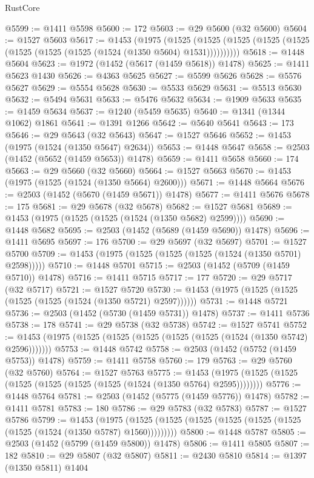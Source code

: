 \begin{lexlean}{RustCore}
\begin{coremodule}
@5599 := @1411 @5598
@5600 := 172
@5603 := @29 @5600 (@32 @5600)
@5604 := @1527 @5603
@5617 := @1453
    (@1975
      (@1525 (@1525 (@1525 (@1525 (@1525 (@1525 (@1525 (@1525 (@1524 (@1350 @5604) @1531))))))))))
@5618 := @1448 @5604
@5623 := @1972 (@1452 (@5617 (@1459 @5618)) @1478)
@5625 := @1411 @5623 @1430
@5626 := @4363 @5625
@5627 := @5599 @5626
@5628 := @5576 @5627
@5629 := @5554 @5628
@5630 := @5533 @5629
@5631 := @5513 @5630
@5632 := @5494 @5631
@5633 := @5476 @5632
@5634 := @1909 @5633
@5635 := @1459 @5634
@5637 := @1240 (@5459 @5635)
@5640 := @1341 (@1344 @1062) @1861
@5641 := @1391 @1266
@5642 := @5640 @5641
@5643 := 173
@5646 := @29 @5643 (@32 @5643)
@5647 := @1527 @5646
@5652 := @1453 (@1975 (@1524 (@1350 @5647) @2634))
@5653 := @1448 @5647
@5658 := @2503 (@1452 (@5652 (@1459 @5653)) @1478)
@5659 := @1411 @5658
@5660 := 174
@5663 := @29 @5660 (@32 @5660)
@5664 := @1527 @5663
@5670 := @1453 (@1975 (@1525 (@1524 (@1350 @5664) @2600)))
@5671 := @1448 @5664
@5676 := @2503 (@1452 (@5670 (@1459 @5671)) @1478)
@5677 := @1411 @5676
@5678 := 175
@5681 := @29 @5678 (@32 @5678)
@5682 := @1527 @5681
@5689 := @1453 (@1975 (@1525 (@1525 (@1524 (@1350 @5682) @2599))))
@5690 := @1448 @5682
@5695 := @2503 (@1452 (@5689 (@1459 @5690)) @1478)
@5696 := @1411 @5695
@5697 := 176
@5700 := @29 @5697 (@32 @5697)
@5701 := @1527 @5700
@5709 := @1453 (@1975 (@1525 (@1525 (@1525 (@1524 (@1350 @5701) @2598)))))
@5710 := @1448 @5701
@5715 := @2503 (@1452 (@5709 (@1459 @5710)) @1478)
@5716 := @1411 @5715
@5717 := 177
@5720 := @29 @5717 (@32 @5717)
@5721 := @1527 @5720
@5730 := @1453 (@1975 (@1525 (@1525 (@1525 (@1525 (@1524 (@1350 @5721) @2597))))))
@5731 := @1448 @5721
@5736 := @2503 (@1452 (@5730 (@1459 @5731)) @1478)
@5737 := @1411 @5736
@5738 := 178
@5741 := @29 @5738 (@32 @5738)
@5742 := @1527 @5741
@5752 := @1453 (@1975 (@1525 (@1525 (@1525 (@1525 (@1525 (@1524 (@1350 @5742) @2596)))))))
@5753 := @1448 @5742
@5758 := @2503 (@1452 (@5752 (@1459 @5753)) @1478)
@5759 := @1411 @5758
@5760 := 179
@5763 := @29 @5760 (@32 @5760)
@5764 := @1527 @5763
@5775 := @1453 (@1975 (@1525 (@1525 (@1525 (@1525 (@1525 (@1525 (@1524 (@1350 @5764) @2595))))))))
@5776 := @1448 @5764
@5781 := @2503 (@1452 (@5775 (@1459 @5776)) @1478)
@5782 := @1411 @5781
@5783 := 180
@5786 := @29 @5783 (@32 @5783)
@5787 := @1527 @5786
@5799 := @1453
    (@1975 (@1525 (@1525 (@1525 (@1525 (@1525 (@1525 (@1525 (@1524 (@1350 @5787) @1560)))))))))
@5800 := @1448 @5787
@5805 := @2503 (@1452 (@5799 (@1459 @5800)) @1478)
@5806 := @1411 @5805
@5807 := 182
@5810 := @29 @5807 (@32 @5807)
@5811 := @2430 @5810
@5814 := @1397 (@1350 @5811) @1404

\end{coremodule}
\end{lexlean}
